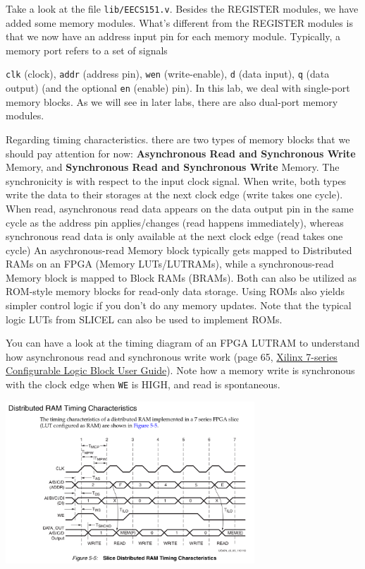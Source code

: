 \documentclass[11pt]{article}
\begin{document}
Take a look at the file \verb|lib/EECS151.v|. Besides the REGISTER modules, we have added some memory modules. What's different from the REGISTER modules is that we now have an address input pin for each memory module. Typically, a memory port refers to a set of signals {\texttt{clk} (clock), \texttt{addr} (address pin),  \texttt{wen} (write-enable), \texttt{d} (data input), \texttt{q} (data output) (and the optional \texttt{en} (enable) pin). In this lab, we deal with single-port memory blocks. As we will see in later labs, there are also dual-port memory modules.

Regarding timing characteristics. there are two types of memory blocks that we should pay attention for now: \textbf{Asynchronous Read and Synchronous Write} Memory, and \textbf{Synchronous Read and Synchronous Write} Memory. The synchronicity is with respect to the input clock signal. When write, both types write the data to their storages at the next clock edge (write takes one cycle). When read, asynchronous read data appears on the data output pin in the same cycle as the address pin applies/changes (read happens immediately), whereas synchronous read data is only available at the next clock edge (read takes one cycle)
An asychronous-read Memory block typically gets mapped to Distributed RAMs on an FPGA (Memory LUTs/LUTRAMs), while a synchronous-read Memory block is mapped to Block RAMs (BRAMs).
Both can also be utilized as ROM-style memory blocks for read-only data storage. Using ROMs also yields simpler control logic if you don't do any memory updates. Note that the typical logic LUTs from SLICEL can also be used to implement ROMs.

You can have a look at the timing diagram of an FPGA LUTRAM to understand how asynchronous read and synchronous write work (page 65, \href{http://www.xilinx.com/support/documentation/user_guides/ug474_7Series_CLB.pdf}{Xilinx 7-series Configurable Logic Block User Guide}). Note how a memory write is synchronous with the clock edge when \texttt{WE} is HIGH, and read is spontaneous.

\begin{center}
\includegraphics[width=0.7\textwidth]{figs/lutram_timing.png}
\end{center}

}
\end{document}
